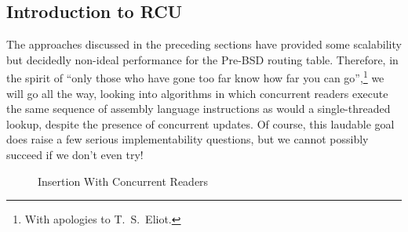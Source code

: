 
\subsection{Introduction to RCU}
\label{sec:defer:Introduction to RCU}

The approaches discussed in the preceding sections have provided
some scalability but decidedly non-ideal performance for the
Pre-BSD routing table.
Therefore, in the spirit of ``only those who have gone too far
know how far you can go'',\footnote{
	With apologies to T.~S.~Eliot.}
we will go all the way, looking into algorithms in which concurrent
readers execute the same sequence of assembly language instructions as
would a single-threaded lookup, despite the presence of concurrent
updates.
Of course, this laudable goal does raise a few serious implementability
questions, but we cannot possibly succeed if we don't even try!

\begin{figure}[tb]
\centering
{}
\caption{Insertion With Concurrent Readers}
\label{fig:defer:Insertion With Concurrent Readers}
\end{figure}

